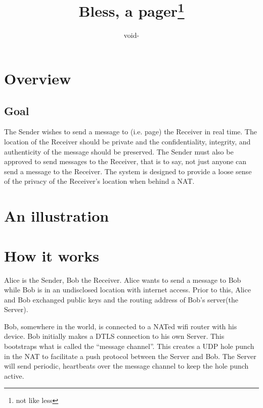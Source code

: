 \documentclass[11pt]{article}
\title{Bless, a pager\footnote{not like less}}
\author{void-}
\begin{document}
\maketitle
\section*{Overview}
\subsection*{Goal}
The Sender wishes to send a message to (i.e. page) the Receiver in real time.
The location of the Receiver should be private and the confidentiality,
integrity, and authenticity of the message should be preserved. The Sender must
also be approved to send messages to the Receiver, that is to say, not just
anyone can send a message to the Receiver. The system is designed to provide a
loose sense of the privacy of the Receiver's location when behind a NAT.

\section*{An illustration}

\section*{How it works}
Alice is the Sender, Bob the Receiver. Alice wants to send a message to Bob
while Bob is in an undisclosed location with internet access. Prior to this,
Alice and Bob exchanged public keys and the routing address of Bob's server(the
Server).

Bob, somewhere in the world, is connected to a NATed wifi router with his
device. Bob initially makes a DTLS connection to his own Server. This
bootstraps what is called the ``message channel''. This creates a UDP hole
punch in the NAT to facilitate a push protocol between the Server and Bob.
The Server will send periodic, heartbeats over the message channel to keep the
hole punch active.
\end{document}
